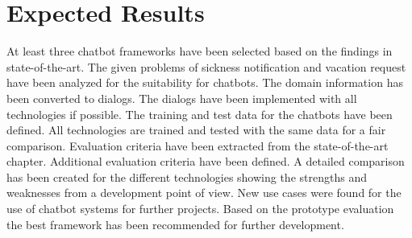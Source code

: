 \section{Expected Results}
At least three chatbot frameworks have been selected based on the findings in 
state-of-the-art.
The given problems of sickness notification and vacation request have been analyzed 
for the suitability for chatbots.
The domain information has been converted to dialogs.
The dialogs have been implemented with all technologies if possible.
The training and test data for the chatbots have been defined.
All technologies are trained and tested with the same data for a fair comparison.
Evaluation criteria have been extracted from the state-of-the-art chapter.
Additional evaluation criteria have been defined.
A detailed comparison has been created for the different technologies showing the strengths 
and weaknesses from a development point of view.
New use cases were found for the use of chatbot systems for further projects.
Based on the prototype evaluation the best framework has been recommended for further development.